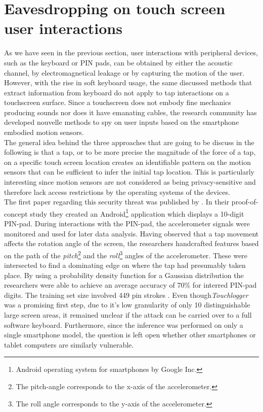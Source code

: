 \section{Eavesdropping on touch screen user interactions}
As we have seen in the previous section, user interactions with peripheral devices, such as the keyboard or PIN pads, can be obtained by either the acoustic channel, by electromagnetical leakage or by capturing the motion of the user. However, with the rise in soft keyboard usage, the same discussed methods that extract information from keyboard do not apply to tap interactions on a touchscreen surface. Since a touchscreen does not embody fine mechanics producing sounds nor does it have emanating cables, the research community has developed nouvelle methods to spy on user inputs based on the smartphone embodied motion sensors.\\

The general idea behind the three approaches that are going to be discuss in the following is that a tap, or to be more precise the magnitude of the force of a tap, on a specific touch screen location creates an identifiable pattern on the motion sensors that can be sufficient to infer the initial tap location. This is particularly interesting since motion sensors are not considered as being privacy-sensitive and therefore lack access restrictions by the operating systems of the devices.\\

The first paper regarding this security threat was published by \citeauthor{Touchlogger}. In their proof-of-concept study they created an Android\footnote{Android operating system for smartphones by Google Inc.} application which displays a 10-digit PIN-pad. During interactions with the PIN-pad, the accelerometer signals were monitored and used for later data analysis. Having observed that a tap movement affects the rotation angle of the screen, the researchers handcrafted features based on the path of the \textit{pitch}\footnote{The pitch-angle corresponds to the x-axis of the accelerometer.} and the \textit{roll}\footnote{The roll angle corresponds to the y-axis of the accelerometer.} angles of the accelerometer. These were intersected to find a dominating edge on where the tap had presumably taken place. By using a probability density function for a Gaussian distribution the researchers were able to achieve an average accuracy of 70\% for interred PIN-pad digits. The training set size involved 449 pin strokes \cite{Touchlogger}. Even though\textit{Touchlogger} was a promising first step, due to it's low granularity of only 10 distinguishable large screen areas, it remained unclear if the attack can be carried over to a full software keyboard. Furthermore, since the inference was performed on only a single smartphone model, the question is left open whether other smartphones or tablet computers are similarly vulnerable.\\

